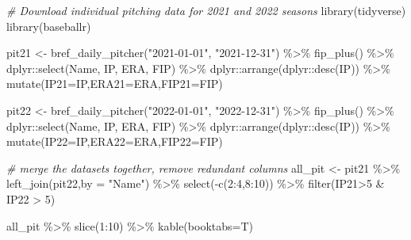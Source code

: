 \documentclass[
  11pt,
]{book}
\newenvironment{Shaded}{\begin{snugshade}}{\end{snugshade}}
\newcommand{\AttributeTok}[1]{\textcolor[rgb]{0.77,0.63,0.00}{#1}}
\newcommand{\CommentTok}[1]{\textcolor[rgb]{0.56,0.35,0.01}{\textit{#1}}}
\newcommand{\DecValTok}[1]{\textcolor[rgb]{0.00,0.00,0.81}{#1}}
\newcommand{\FunctionTok}[1]{\textcolor[rgb]{0.00,0.00,0.00}{#1}}
\newcommand{\NormalTok}[1]{#1}
\newcommand{\OtherTok}[1]{\textcolor[rgb]{0.56,0.35,0.01}{#1}}
\newcommand{\SpecialCharTok}[1]{\textcolor[rgb]{0.00,0.00,0.00}{#1}}
\newcommand{\StringTok}[1]{\textcolor[rgb]{0.31,0.60,0.02}{#1}}
\theoremstyle{definition}
\theoremstyle{definition}
\theoremstyle{definition}
\theoremstyle{definition}
\theoremstyle{remark}
\begin{document}
\begin{Shaded}
\begin{Highlighting}[]
\CommentTok{\# Download individual pitching data for 2021 and 2022 seasons}
\FunctionTok{library}\NormalTok{(tidyverse)}
\FunctionTok{library}\NormalTok{(baseballr)}

\NormalTok{pit21 }\OtherTok{\textless{}{-}} \FunctionTok{bref\_daily\_pitcher}\NormalTok{(}\StringTok{"2021{-}01{-}01"}\NormalTok{, }\StringTok{"2021{-}12{-}31"}\NormalTok{) }\SpecialCharTok{\%\textgreater{}\%} 
  \FunctionTok{fip\_plus}\NormalTok{() }\SpecialCharTok{\%\textgreater{}\%} 
\NormalTok{  dplyr}\SpecialCharTok{::}\FunctionTok{select}\NormalTok{(Name, IP, ERA, FIP) }\SpecialCharTok{\%\textgreater{}\%}
\NormalTok{  dplyr}\SpecialCharTok{::}\FunctionTok{arrange}\NormalTok{(dplyr}\SpecialCharTok{::}\FunctionTok{desc}\NormalTok{(IP)) }\SpecialCharTok{\%\textgreater{}\%}
  \FunctionTok{mutate}\NormalTok{(}\AttributeTok{IP21=}\NormalTok{IP,}\AttributeTok{ERA21=}\NormalTok{ERA,}\AttributeTok{FIP21=}\NormalTok{FIP)}

\NormalTok{pit22 }\OtherTok{\textless{}{-}} \FunctionTok{bref\_daily\_pitcher}\NormalTok{(}\StringTok{"2022{-}01{-}01"}\NormalTok{, }\StringTok{"2022{-}12{-}31"}\NormalTok{) }\SpecialCharTok{\%\textgreater{}\%} 
  \FunctionTok{fip\_plus}\NormalTok{() }\SpecialCharTok{\%\textgreater{}\%} 
\NormalTok{  dplyr}\SpecialCharTok{::}\FunctionTok{select}\NormalTok{(Name, IP, ERA, FIP) }\SpecialCharTok{\%\textgreater{}\%}
\NormalTok{  dplyr}\SpecialCharTok{::}\FunctionTok{arrange}\NormalTok{(dplyr}\SpecialCharTok{::}\FunctionTok{desc}\NormalTok{(IP)) }\SpecialCharTok{\%\textgreater{}\%}
  \FunctionTok{mutate}\NormalTok{(}\AttributeTok{IP22=}\NormalTok{IP,}\AttributeTok{ERA22=}\NormalTok{ERA,}\AttributeTok{FIP22=}\NormalTok{FIP)}

\CommentTok{\# merge the datasets together, remove redundant columns}
\NormalTok{all\_pit }\OtherTok{\textless{}{-}}\NormalTok{ pit21 }\SpecialCharTok{\%\textgreater{}\%} 
  \FunctionTok{left\_join}\NormalTok{(pit22,}\AttributeTok{by =} \StringTok{"Name"}\NormalTok{) }\SpecialCharTok{\%\textgreater{}\%} 
  \FunctionTok{select}\NormalTok{(}\SpecialCharTok{{-}}\FunctionTok{c}\NormalTok{(}\DecValTok{2}\SpecialCharTok{:}\DecValTok{4}\NormalTok{,}\DecValTok{8}\SpecialCharTok{:}\DecValTok{10}\NormalTok{)) }\SpecialCharTok{\%\textgreater{}\%}
  \FunctionTok{filter}\NormalTok{(IP21}\SpecialCharTok{\textgreater{}}\DecValTok{5} \SpecialCharTok{\&}\NormalTok{ IP22 }\SpecialCharTok{\textgreater{}} \DecValTok{5}\NormalTok{)}

\NormalTok{all\_pit }\SpecialCharTok{\%\textgreater{}\%} \FunctionTok{slice}\NormalTok{(}\DecValTok{1}\SpecialCharTok{:}\DecValTok{10}\NormalTok{) }\SpecialCharTok{\%\textgreater{}\%} \FunctionTok{kable}\NormalTok{(}\AttributeTok{booktabs=}\NormalTok{T)}
\end{Highlighting}
\end{Shaded}
\end{document}
